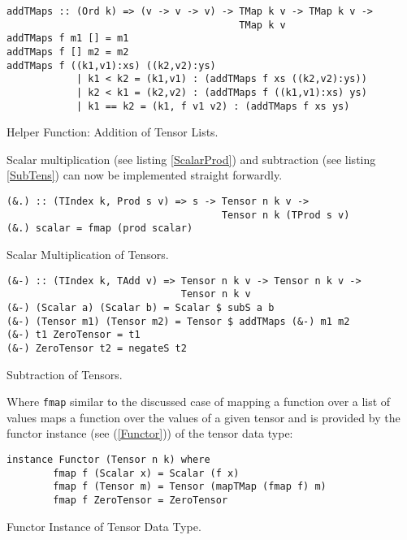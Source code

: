 \begin{listing}[hbt!] 
\begin{verbatim}
addTMaps :: (Ord k) => (v -> v -> v) -> TMap k v -> TMap k v ->
                                        TMap k v 
addTMaps f m1 [] = m1 
addTMaps f [] m2 = m2 
addTMaps f ((k1,v1):xs) ((k2,v2):ys) 
            | k1 < k2 = (k1,v1) : (addTMaps f xs ((k2,v2):ys))
            | k2 < k1 = (k2,v2) : (addTMaps f ((k1,v1):xs) ys)
            | k1 == k2 = (k1, f v1 v2) : (addTMaps f xs ys) 
\end{verbatim} 
\caption{Helper Function: Addition of Tensor Lists.}\label{addTmaps}
\end{listing}

Scalar multiplication (see listing \ref{ScalarProd}) and subtraction (see listing \ref{SubTens}) can now be implemented straight forwardly.
\begin{listing}[hbt!] 
\begin{verbatim}
(&.) :: (TIndex k, Prod s v) => s -> Tensor n k v ->
                                     Tensor n k (TProd s v)
(&.) scalar = fmap (prod scalar)
\end{verbatim} 
\caption{Scalar Multiplication of Tensors.}\label{ScalarProd}
\end{listing}

\begin{listing}[hbt!] 
\begin{verbatim}
(&-) :: (TIndex k, TAdd v) => Tensor n k v -> Tensor n k v ->
                              Tensor n k v
(&-) (Scalar a) (Scalar b) = Scalar $ subS a b
(&-) (Tensor m1) (Tensor m2) = Tensor $ addTMaps (&-) m1 m2
(&-) t1 ZeroTensor = t1
(&-) ZeroTensor t2 = negateS t2
\end{verbatim} 
\caption{Subtraction of Tensors.}\label{SubTens}
\end{listing}
Where \texttt{fmap} similar to the discussed case of mapping a function over a list of values maps a function over the values of a given tensor and is provided by the functor instance (see (\ref{Functor})) of the tensor data type:

\begin{listing}[hbt!] 
\begin{verbatim}
instance Functor (Tensor n k) where 
        fmap f (Scalar x) = Scalar (f x)
        fmap f (Tensor m) = Tensor (mapTMap (fmap f) m)
        fmap f ZeroTensor = ZeroTensor 
\end{verbatim}
\caption{Functor Instance of Tensor Data Type.}\label{Functor}
\end{listing}

